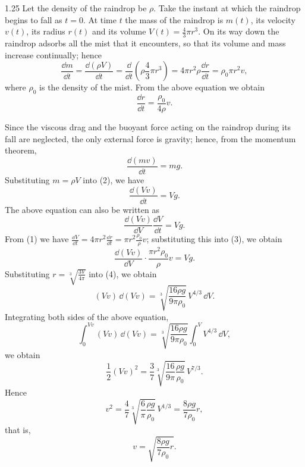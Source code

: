 \begin{solution}{1.25}
Let the density of the raindrop be $\rho$. Take the instant at which the raindrop begins to
fall as $t=0$. At time $t$ the mass of the raindrop is $m(t)$, its velocity $v(t)$, its radius
$r(t)$ and its volume $V(t)=\frac{4}{3}\pi r^3$. On its way down the raindrop adsorbs all the
mist that it encounters, so that its volume and mass increase continually; hence
\begin{equation*}
\frac{\dd m}{\dd t}=\frac{\dd(\rho V)}{\dd t}
=\frac{\dd}{\dd t}\left(\rho\frac{4}{3}\pi r^3\right)
=4\pi r^2\rho\frac{\dd r}{\dd t}
=\rho_0\pi r^2v,
\end{equation*}
where $\rho_0$ is the density of the mist. From the above equation we obtain
\begin{equation}
\frac{\dd r}{\dd t}=\frac{\rho_0}{4\rho}v. \tag{1}
\end{equation}

Since the viscous drag and the buoyant force acting on the raindrop during its fall are
neglected, the only external force is gravity; hence, from the momentum theorem,
\begin{equation}
\frac{\dd(mv)}{\dd t}=mg. \tag{2}
\end{equation}
Substituting $m=\rho V$ into (2), we have
\begin{equation*}
\frac{\dd(Vv)}{\dd t}=Vg.
\end{equation*}
The above equation can also be written as
\begin{equation}
\frac{\dd(Vv)}{\dd V}\frac{\dd V}{\dd t}=Vg. \tag{3}
\end{equation}
From (1) we have
$\frac{\dd V}{\dd t}=4\pi r^2\frac{\dd r}{\dd t}=\pi r^2\frac{\rho_0}{\rho}v$; substituting
this into (3), we obtain
\begin{equation}
\frac{\dd(Vv)}{\dd V}\cdot\frac{\pi r^2\rho_0}{\rho}v=Vg. \tag{4}
\end{equation}
Substituting $r=\sqrt[3]{\frac{3V}{4\pi}}$ into (4), we obtain
\begin{equation*}
(Vv)\,\dd(Vv)=\sqrt[3]{\frac{16\rho g}{9\pi\rho_0}}\,V^{4/3}\,\dd V.
\end{equation*}
Integrating both sides of the above equation,
\begin{equation*}
\int_0^{Vv}(Vv)\,\dd(Vv)
=\sqrt[3]{\frac{16\rho g}{9\pi\rho_0}}\int_0^V V^{4/3}\,\dd V,
\end{equation*}
we obtain
\begin{equation*}
\frac{1}{2}(Vv)^2=\frac{3}{7}\sqrt[3]{\frac{16}{9\pi}\frac{\rho g}{\rho_0}}\,V^{7/3}.
\end{equation*}
Hence
\begin{equation*}
v^2=\frac{4}{7}\sqrt[3]{\frac{6}{\pi}\frac{\rho g}{\rho_0}}\,V^{1/3}
=\frac{8\rho g}{7\rho_0}r,
\end{equation*}
that is,
\begin{equation}
v=\sqrt{\frac{8\rho g}{7\rho_0}r}. \tag{5}
\end{equation}


\end{solution}
